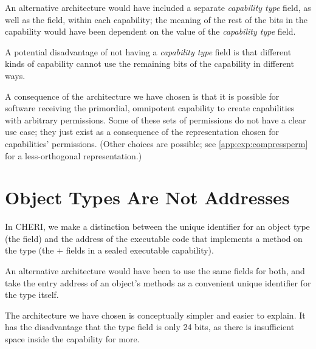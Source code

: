 An alternative architecture would have included a separate
\emph{capability type} field, as well as the \cperms{} field, within each
capability; the meaning of the rest of the bits in the capability would have
been dependent on the value of the \emph{capability type} field.

A potential disadvantage of not having a \emph{capability type} field is that
different kinds of capability cannot use the remaining bits of the capability
in different ways.

A consequence of the architecture we have chosen is that it is possible for
software receiving the primordial, omnipotent capability to create capabilities
with arbitrary permissions.  Some of these sets of permissions do not have a
clear use case; they just exist as a consequence of the representation chosen
for capabilities' permissions.  (Other choices are possible; see
\cref{app:exp:compressperm} for a less-orthogonal representation.)


\section{Object Types Are Not Addresses}

In CHERI, we make a distinction between the unique identifier for an
object type (the \cotype{} field) and the address of the executable code
that implements a method on the type (the \cbase{} $+$ \coffset{} fields
in a sealed executable capability).

An alternative architecture would have been to use the same fields for
both, and take the entry address of an object's methods as a convenient
unique identifier for the type itself.

The architecture we have chosen is conceptually simpler and easier to
explain. It has the disadvantage that the type field is only 24 bits,
as there is insufficient space inside the capability for more.


